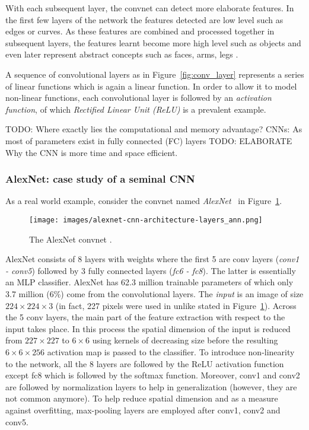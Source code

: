 \documentclass[12pt,a4paper]{article}
\begin{document}
With each subsequent layer, the convnet can detect more elaborate features. In the first few layers of the network the features detected are low level such as edges or curves. As these features are combined and processed together in subsequent layers, the features learnt become more high level such as objects and even later represent abstract concepts such as faces, arms, legs \cite{DeepVis}.

A sequence of convolutional layers as in Figure~\ref{fig:conv_layer} represents a series of linear functions which is again a linear function. In order to allow it to model non-linear functions, each convolutional layer is followed by an \textit{activation function}, of which \textit{Rectified Linear Unit (ReLU)} is a prevalent example.

\par TODO: Where exactly lies the computational and memory advantage? CNNs: As most of parameters exist in fully connected (FC) layers TODO: ELABORATE Why the CNN is more time and space efficient.

\subsubsection{AlexNet: case study of a seminal CNN}\label{subsubsec:alexnet}
As a real world example, consider the convnet named \textit{AlexNet}~\cite{AlexNet} in Figure~\ref{fig:AlexNet}.
\begin{figure}[ht]
\centering
\texttt{[image: images/alexnet-cnn-architecture-layers\_ann.png]}
\caption{The AlexNet convnet \cite{AlexNet}.}
\label{fig:AlexNet}
\end{figure}
AlexNet consists of 8 layers with weights where the first 5 are conv layers (\textit{conv1 - conv5}) followed by 3 fully connected layers (\textit{fc6 - fc8}). The latter is essentially an MLP classifier. AlexNet has 62.3 million trainable parameters of which only 3.7 million (6\%) come from the convolutional layers. The \textit{input} is an image of size $224 \times 224 \times 3$ (in fact, 227 pixels were used in \cite{AlexNet} unlike stated in Figure~\ref{fig:AlexNet}). Across the 5 conv layers, the main part of the feature extraction with respect to the input takes place. In this process the spatial dimension of the input is reduced from $227 \times 227$ to $6 \times 6$ using kernels of decreasing size before the resulting $6 \times 6 \times 256$ activation map is passed to the classifier. To introduce non-linearity to the network, all the 8 layers are followed by the ReLU activation function except fc8 which is followed by the softmax function. Moreover, conv1 and conv2 are followed by normalization layers to help in generalization (however, they are not common anymore). To help reduce spatial dimension and as a measure against overfitting, max-pooling layers are employed after conv1, conv2 and conv5. 
\end{document}
